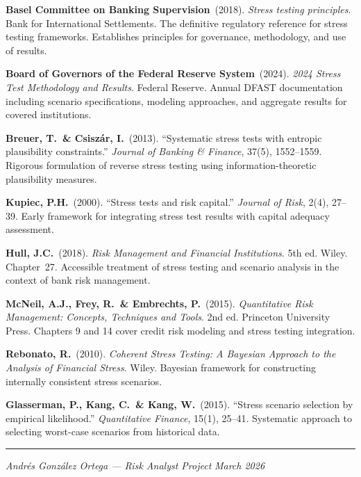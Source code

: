 \documentclass[11pt, a4paper]{article}
\theoremstyle{definition}
\theoremstyle{plain}
\theoremstyle{remark}
\begin{document}
\begin{enumerate}[label={[\arabic*]}, leftmargin=2cm]
    \item \textbf{Basel Committee on Banking Supervision}\ (2018).
          \emph{Stress testing principles}.
          Bank for International Settlements.
          The definitive regulatory reference for stress testing frameworks.
          Establishes principles for governance, methodology, and use of results.

    \item \textbf{Board of Governors of the Federal Reserve System}\ (2024).
          \emph{2024 Stress Test Methodology and Results}.
          Federal Reserve.
          Annual DFAST documentation including scenario specifications,
          modeling approaches, and aggregate results for covered institutions.

    \item \textbf{Breuer, T.\ \& Csisz\'ar, I.}\ (2013).
          ``Systematic stress tests with entropic plausibility constraints.''
          \emph{Journal of Banking \& Finance}, 37(5), 1552--1559.
          Rigorous formulation of reverse stress testing using information-theoretic plausibility measures.

    \item \textbf{Kupiec, P.H.}\ (2000).
          ``Stress tests and risk capital.''
          \emph{Journal of Risk}, 2(4), 27--39.
          Early framework for integrating stress test results with capital adequacy assessment.

    \item \textbf{Hull, J.C.}\ (2018).
          \emph{Risk Management and Financial Institutions}. 5th ed.
          Wiley. Chapter~27.
          Accessible treatment of stress testing and scenario analysis
          in the context of bank risk management.

    \item \textbf{McNeil, A.J., Frey, R.\ \& Embrechts, P.}\ (2015).
          \emph{Quantitative Risk Management: Concepts, Techniques and Tools}. 2nd ed.
          Princeton University Press.
          Chapters 9 and 14 cover credit risk modeling and stress testing integration.

    \item \textbf{Rebonato, R.}\ (2010).
          \emph{Coherent Stress Testing: A Bayesian Approach to the Analysis of Financial Stress}.
          Wiley.
          Bayesian framework for constructing internally consistent stress scenarios.

    \item \textbf{Glasserman, P., Kang, C.\ \& Kang, W.}\ (2015).
          ``Stress scenario selection by empirical likelihood.''
          \emph{Quantitative Finance}, 15(1), 25--41.
          Systematic approach to selecting worst-case scenarios from historical data.
\end{enumerate}

\vfill
\hrule
\smallskip
\noindent\textit{Andr\'es Gonz\'alez Ortega --- Risk Analyst Project} \hfill \textit{March 2026}
\end{document}
